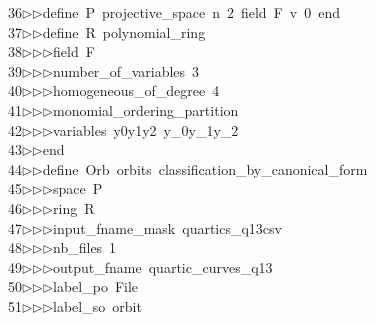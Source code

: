 \begin{tabbing}
36\>$\triangleright$\>$\triangleright$\>define\ P\ projective\_space\ n\ 2\ field\ F\ v\ 0\ end\ \\[0pt]
37\>$\triangleright$\>$\triangleright$\>define\ R\ polynomial\_ring\ \\[0pt]
38\>$\triangleright$\>$\triangleright$\>$\triangleright$\>field\ F\ \\[0pt]
39\>$\triangleright$\>$\triangleright$\>$\triangleright$\>number\_of\_variables\ 3\ \\[0pt]
40\>$\triangleright$\>$\triangleright$\>$\triangleright$\>homogeneous\_of\_degree\ 4\ \\[0pt]
41\>$\triangleright$\>$\triangleright$\>$\triangleright$\>monomial\_ordering\_partition\ \\[0pt]
42\>$\triangleright$\>$\triangleright$\>$\triangleright$\>variables\ y0y1y2\ y\_0y\_1y\_2\ \\[0pt]
43\>$\triangleright$\>$\triangleright$\>end\ \\[0pt]
44\>$\triangleright$\>$\triangleright$\>define\ Orb\ orbits\ classification\_by\_canonical\_form\ \\[0pt]
45\>$\triangleright$\>$\triangleright$\>$\triangleright$\>space\ P\ \\[0pt]
46\>$\triangleright$\>$\triangleright$\>$\triangleright$\>ring\ R\ \\[0pt]
47\>$\triangleright$\>$\triangleright$\>$\triangleright$\>input\_fname\_mask\ quartics\_q13csv\ \\[0pt]
48\>$\triangleright$\>$\triangleright$\>$\triangleright$\>nb\_files\ 1\ \\[0pt]
49\>$\triangleright$\>$\triangleright$\>$\triangleright$\>output\_fname\ quartic\_curves\_q13\ \\[0pt]
50\>$\triangleright$\>$\triangleright$\>$\triangleright$\>label\_po\ File\ \\[0pt]
51\>$\triangleright$\>$\triangleright$\>$\triangleright$\>label\_so\ orbit\ \\[0pt]

\end{tabbing}
